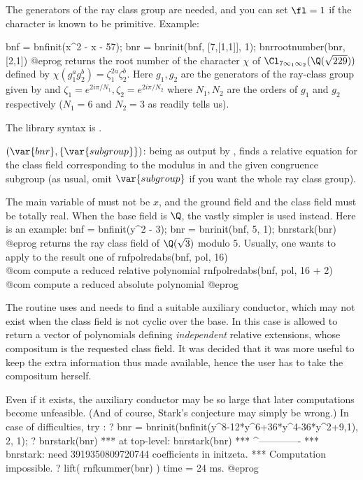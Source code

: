 The generators of the ray class group are needed, and you can set $\fl=1$ if
the character is known to be primitive. Example:

\bprog
bnf = bnfinit(x^2 - x - 57);
bnr = bnrinit(bnf, [7,[1,1]], 1);
bnrrootnumber(bnr, [2,1])
@eprog\noindent
returns the root number of the character $\chi$ of
$\Cl_{7\infty_1\infty_2}(\Q(\sqrt{229}))$ defined by $\chi(g_1^ag_2^b)
= \zeta_1^{2a}\zeta_2^b$. Here $g_1, g_2$ are the generators of the
ray-class group given by  and $\zeta_1 = e^{2i\pi/N_1},
\zeta_2 = e^{2i\pi/N_2}$ where $N_1, N_2$ are the orders of $g_1$ and
$g_2$ respectively ($N_1=6$ and $N_2=3$ as  readily tells us).

The library syntax is .

$(\var{bnr},\{\var{subgroup}\})$: \label{se:bnrstark} being as output by , finds a relative equation
for the class field corresponding to the modulus in  and the given
congruence subgroup (as usual, omit $\var{subgroup}$ if you want the whole ray
class group).

The main variable of  must not be $x$, and the ground field and the
class field must be totally real. When the base field is $\Q$, the vastly
simpler  is used instead. Here is an example:
\bprog
bnf = bnfinit(y^2 - 3);
bnr = bnrinit(bnf, 5, 1);
bnrstark(bnr)
@eprog\noindent
returns the ray class field of $\Q(\sqrt{3})$ modulo $5$. Usually, one wants
to apply to the result one of
\bprog
rnfpolredabs(bnf, pol, 16)     \\@com compute a reduced relative polynomial
rnfpolredabs(bnf, pol, 16 + 2) \\@com compute a reduced absolute polynomial
@eprog

The routine uses  and needs to find a suitable auxiliary
conductor, which may not exist when the class field is not cyclic over the
base. In this case  is allowed to return a vector of
polynomials defining \emph{independent} relative extensions, whose compositum
is the requested class field. It was decided that it was more useful
to keep the extra information thus made available, hence the user has to take
the compositum herself.

Even if it exists, the auxiliary conductor may be so large that later
computations become unfeasible. (And of course, Stark's conjecture may simply
be wrong.) In case of difficulties, try :
\bprog
? bnr = bnrinit(bnfinit(y^8-12*y^6+36*y^4-36*y^2+9,1), 2, 1);
? bnrstark(bnr)
  ***   at top-level: bnrstark(bnr)
  ***                 ^-------------
  *** bnrstark: need 3919350809720744 coefficients in initzeta.
  *** Computation impossible.
? lift( rnfkummer(bnr) )
time = 24 ms.
@eprog

